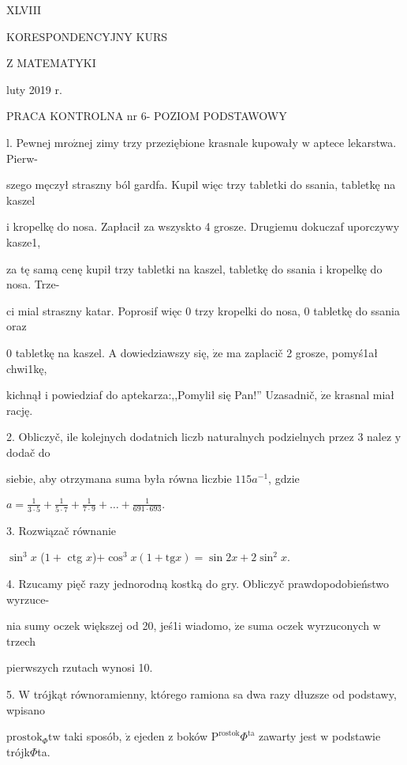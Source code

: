 \documentclass[a4paper,12pt]{article}
\begin{document}
XLVIII

KORESPONDENCYJNY KURS

Z MATEMATYKI

luty 2019 r.

PRACA KONTROLNA nr 6- POZIOM PODSTAWOWY

l. Pewnej $\mathrm{m}\mathrm{r}\mathrm{o}\acute{\mathrm{z}}\mathrm{n}\mathrm{e}\mathrm{j}$ zimy trzy przeziębione krasnale kupowały $\mathrm{w}$ aptece lekarstwa. Pierw-

szego męczył straszny ból gardfa. Kupil więc trzy tabletki do ssania, tabletkę na kaszel

$\mathrm{i}$ kropelkę do nosa. Zapłacił za wszyskto 4 grosze. Drugiemu dokuczaf uporczywy kasze1,

za tę samą cenę kupił trzy tabletki na kaszel, tabletkę do ssania $\mathrm{i}$ kropelkę do nosa. Trze-

ci mial straszny katar. Poprosif więc $0$ trzy kropelki do nosa, $0$ tabletkę do ssania oraz

$0$ tabletkę na kaszel. A dowiedziawszy się, $\dot{\mathrm{z}}\mathrm{e}$ ma zaplacič 2 grosze, pomyś1ał chwi1kę,

kichnął $\mathrm{i}$ powiedziaf do aptekarza:,,Pomylił się Pan!'' Uzasadnič, $\dot{\mathrm{z}}\mathrm{e}$ krasnal miał rację.

2. Obliczyč, ile kolejnych dodatnich liczb naturalnych podzielnych przez 3 nalez $\mathrm{y}$ dodač do

siebie, aby otrzymana suma była równa liczbie $115a^{-1}$, gdzie

$a=\displaystyle \frac{1}{3\cdot 5}+\frac{1}{5\cdot 7}+\frac{1}{7\cdot 9}+\ldots+\frac{1}{691\cdot 693}.$

3. Rozwiązač równanie

$\sin^{3}x$ ($1+$ ctg $x$)$+\cos^{3}x(1+\mathrm{t}\mathrm{g}x)=\sin 2x+2\sin^{2}x.$

4. Rzucamy pięč razy jednorodną kostką do gry. Obliczyč prawdopodobieństwo wyrzuce-

nia sumy oczek większej od 20, jeś1i wiadomo, $\dot{\mathrm{z}}\mathrm{e}$ suma oczek wyrzuconych $\mathrm{w}$ trzech

pierwszych rzutach wynosi 10.

5. $\mathrm{W}$ trójkąt równoramienny, którego ramiona sa dwa razy dłuzsze od podstawy, wpisano

$\mathrm{p}\mathrm{r}\mathrm{o}\mathrm{s}\mathrm{t}\mathrm{o}\mathrm{k}_{\Phi}\mathrm{t}\mathrm{w}$ taki sposób, $\dot{\mathrm{z}}$ ejeden $\mathrm{z}$ boków $\mathrm{P}^{\mathrm{r}\mathrm{o}\mathrm{s}\mathrm{t}\mathrm{o}\mathrm{k}}\Phi^{\mathrm{t}\mathrm{a}}$ zawarty jest $\mathrm{w}$ podstawie trójk$\Phi$ta.
\end{document}
